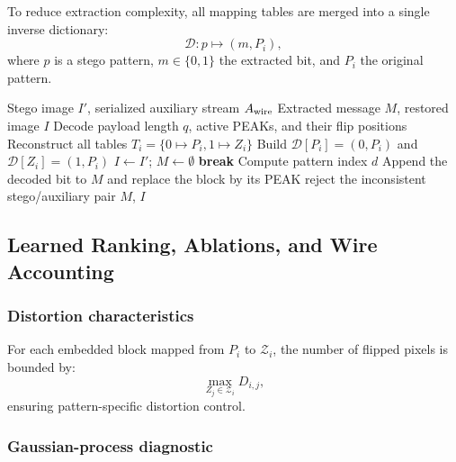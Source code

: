 To reduce extraction complexity, all mapping tables are merged into a single inverse dictionary:
\begin{equation}
\mathcal{D} : p \mapsto (m, P_i),
\label{eq:inverse-dictionary}
\end{equation}
where $p$ is a stego pattern, $m\in\{0,1\}$ the extracted bit, and $P_i$ the
original pattern.

\begin{algorithm*}[t]
\caption{Deterministic Extraction and Exact Restoration}
\label{alg:extraction}
\begin{algorithmic}[1]
\Require Stego image $I'$, serialized auxiliary stream $A_{\rm wire}$
\Ensure Extracted message $M$, restored image $I$
\State Decode payload length $q$, active PEAKs, and their flip positions
\State Reconstruct all tables $T_i=\{0\mapsto P_i,1\mapsto Z_i\}$
\State Build $\mathcal D[P_i]=(0,P_i)$ and $\mathcal D[Z_i]=(1,P_i)$
\State $I\gets I'$; $M\gets\emptyset$
        \State \textbf{break}
    \EndIf
    \State Compute pattern index $d$
        \State Append the decoded bit to $M$ and replace the block by its PEAK
    \EndIf
\EndFor
{}
    \State reject the inconsistent stego/auxiliary pair
\EndIf
\State \Return $M$, $I$
\end{algorithmic}
\end{algorithm*}

\subsection{Learned Ranking, Ablations, and Wire Accounting}

\subsubsection*{Distortion characteristics}

For each embedded block mapped from $P_i$ to $\mathcal{Z}_i$, the number of flipped pixels is bounded by:
\begin{equation}
\max_{Z_j \in \mathcal{Z}_i} D_{i,j},
\label{eq:distortion-bound}
\end{equation}
ensuring pattern-specific distortion control.

\subsubsection*{Gaussian-process diagnostic}
\label{subsec:param_optim}

